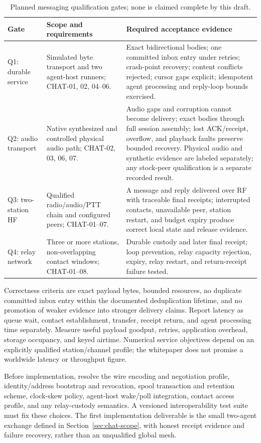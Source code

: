 \begin{longtable}{@{}p{}p{}p{}@{}}
\caption{Planned messaging qualification gates; none is claimed complete by this draft.}\label{tab:chat-qualification}\\
\toprule
\textbf{Gate} & \textbf{Scope and requirements} & \textbf{Required acceptance evidence}\\
\midrule
\endhead
Q1: durable service & Simulated byte transport and two agent-host runners;
CHAT-01, 02, 04--06. & Exact bidirectional bodies; one committed inbox entry under
retries; crash-point recovery; content conflicts rejected; cursor gaps explicit;
idempotent agent processing and reply-loop bounds exercised.\\
Q2: audio transport & Native synthesized and controlled physical audio path;
CHAT-02, 03, 06, 07. & Audio gaps and corruption cannot become delivery; exact
bodies through full session assembly; lost ACK/receipt, overflow, and playback
faults preserve bounded recovery. Physical audio and synthetic evidence are labeled
separately; any stock-peer qualification is a separate recorded result.\\
Q3: two-station HF & Qualified radio/audio/PTT chain and configured peers;
CHAT-01--07. & A message and reply delivered over RF with traceable final receipts;
interrupted contacts, unavailable peer, station restart, and budget expiry produce
correct local state and release evidence.\\
Q4: relay network & Three or more stations, non-overlapping contact windows;
CHAT-01--08. & Durable custody and later final receipt; loop prevention, relay
capacity rejection, expiry, relay restart, and return-receipt failure tested.\\
\bottomrule
\end{longtable}

Correctness criteria are exact payload bytes, bounded resources, no duplicate
committed inbox entry within the documented deduplication lifetime, and no
promotion of weaker evidence into stronger delivery claims. Report latency
as queue wait, contact establishment, transfer, receipt return, and agent
processing time separately. Measure useful payload goodput, retries,
application overhead, storage occupancy, and keyed airtime. Numerical service
objectives depend on an explicitly qualified station/channel profile; the
whitepaper does not promise a worldwide latency or throughput figure.

Before implementation, resolve the wire encoding and negotiation profile,
identity/address bootstrap and revocation, spool transaction and retention
scheme, clock-skew policy, agent-host wake/poll integration, contact access
profile, and any relay-custody semantics. A versioned interoperability test
suite must fix these choices. The first implementation deliverable is the
small two-agent exchange defined in Section~\ref{sec:chat-scope}, with honest
receipt evidence and failure recovery, rather than an unqualified global mesh.
